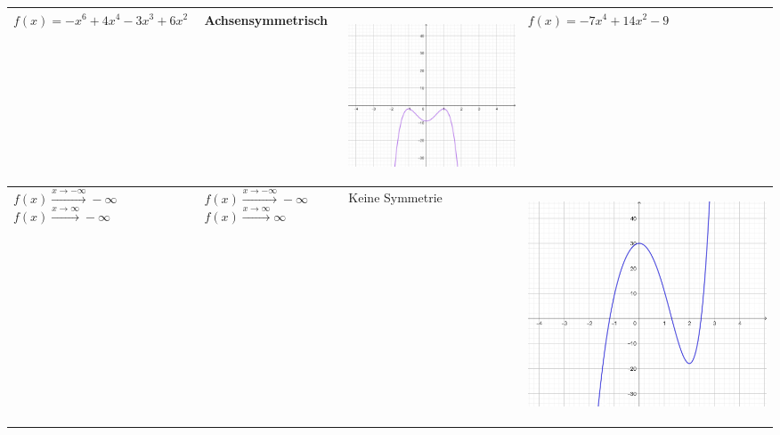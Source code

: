 \documentclass[oneside,openany,headings=optiontotoc,11pt,numbers=noenddot]{scrreprt}
\begin{document}
\begin{table}
\begin{tabular}{|M{4.35cm}|M{4.35cm}||M{4.35cm}|M{4.35cm}|}
			\hline
			\(f(x)=-x^6+4x^4-3x^3+6x^2\)  & Achsensymmetrisch &  \begin{center}\includegraphics[scale=0.15]{04-GanzrationaleFunktionen/f1.jpg}\end{center}& \(f(x)=-7x^4+14x^2-9\) \\
			\hline
			 &  & Keine Symmetrie &\begin{center}\includegraphics[scale=0.15]{04-GanzrationaleFunktionen/u1.jpg}\end{center}\\

\end{tabular}
\end{table}
\end{document}
